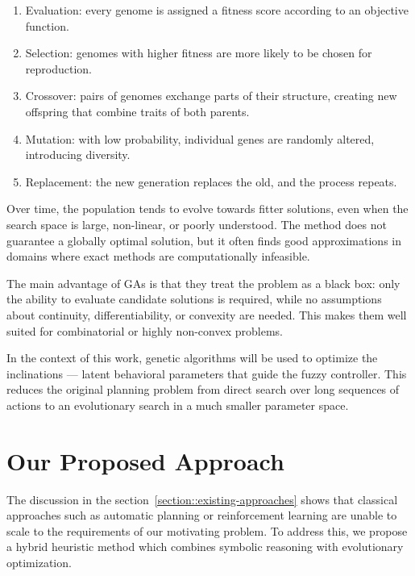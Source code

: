 \documentclass[12pt, a4paper]{report}
\begin{document}
		\begin{enumerate}
			\item Evaluation: every genome is assigned a fitness score according to an objective function.
		
		\item Selection: genomes with higher fitness are more likely to be chosen for reproduction.
		
		\item Crossover: pairs of genomes exchange parts of their structure, creating new offspring that combine traits of both parents.
		
		\item Mutation: with low probability, individual genes are randomly altered, introducing diversity.
		
		\item Replacement: the new generation replaces the old, and the process repeats.
		\end{enumerate}
		
		Over time, the population tends to evolve towards fitter solutions, even when the search space is large, non-linear, or poorly understood. The method does not guarantee a globally optimal solution, but it often finds good approximations in domains where exact methods are computationally infeasible.
		
		The main advantage of GAs is that they treat the problem as a black box: only the ability to evaluate candidate solutions is required, while no assumptions about continuity, differentiability, or convexity are needed. This makes them well suited for combinatorial or highly non-convex problems.
		
		In the context of this work, genetic algorithms will be used to optimize the inclinations — latent behavioral parameters that guide the fuzzy controller. This reduces the original planning problem from direct search over long sequences of actions to an evolutionary search in a much smaller parameter space.
	
	\section{Our Proposed Approach}
	
	The discussion in the section~\ref{section::existing-approaches} shows that classical approaches such as automatic planning or reinforcement learning are unable to scale to the requirements of our motivating problem. To address this, we propose a hybrid heuristic method which combines symbolic reasoning with evolutionary optimization.
	
\end{document}
